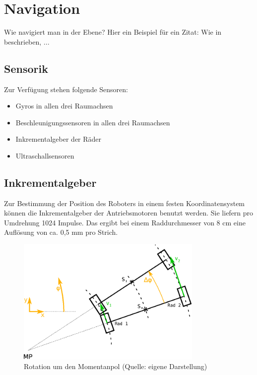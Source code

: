 \renewcommand{\autoren}{Stephan Morongowski}
\newpage
\section{Navigation}

Wie navigiert man in der Ebene? Hier ein Beispiel für ein Zitat: Wie in \cite{bildungAtmosphaere} beschrieben, ...

\subsection{Sensorik}
Zur Verfügung stehen folgende Sensoren:
\begin{itemize}
\item Gyros in allen drei Raumachsen
\item Beschleunigungssensoren in allen drei Raumachsen
\item Inkrementalgeber der Räder
\item Ultraschallsensoren
\end{itemize}

\subsection{Inkrementalgeber}

Zur Bestimmung der Position des Roboters in einem festen Koordinatensystem können die Inkrementalgeber der Antriebsmotoren benutzt werden.
Sie liefern pro Umdrehung 1024 Impulse. Das ergibt bei einem Raddurchmesser von 8 cm eine Auflösung von ca. 0,5 mm pro Strich.

\begin{figure}[h]  %
\centering\includegraphics[width=0.8\textwidth]{images/Kurvenkinematic.eps}
\caption{Rotation um den Momentanpol \newline (Quelle: eigene Darstellung)}
\label{kurvenkinematik}
\end{figure}

